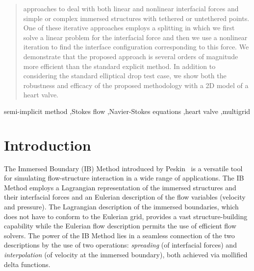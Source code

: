 \documentclass[preprint,12pt]{elsarticle}
\begin{document}
\begin{frontmatter}
\begin{abstract}
approaches to deal with both linear and nonlinear interfacial forces and simple or complex immersed structures with tethered or untethered points.  One of these iterative approaches employs a splitting in which 
we first solve a linear problem  for the interfacial force and then we use a nonlinear iteration to find the interface configuration corresponding to this force.  We demonstrate that the proposed approach is several orders of magnitude more efficient than the standard explicit method. In addition to considering the standard elliptical drop test case, we show both the robustness and efficacy of the proposed methodology with a  2D model of a heart valve.
\end{abstract}

\begin{keyword}
semi-implicit method \sep Stokes flow \sep Navier-Stokes equations \sep heart valve \sep multigrid


\end{keyword}

\end{frontmatter}

\section{Introduction}
The Immersed Boundary (IB) Method introduced by Peskin~\cite{Peskin77} is a versatile tool for simulating flow-structure interaction in a wide range of applications.  The IB Method employs a Lagrangian representation of 
the immersed structures and their interfacial forces and an Eulerian description of the 
flow variables (velocity and pressure).  The Lagrangian description of the immersed boundaries, which does not have to conform to the Eulerian grid,  provides a vast structure-building capability while the Eulerian flow description permits the use of efficient flow solvers.
The power of the IB Method lies in a seamless connection of the two descriptions by the use of two operations: 
{\em spreading} (of interfacial forces) and {\em interpolation} (of velocity at the immersed boundary), both achieved via mollified delta functions. 
  
\end{document}
